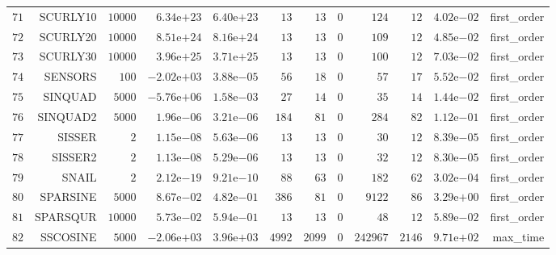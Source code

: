 \begin{longtable}{rrrrrrrrrrrr}
  \(    71\) & SCURLY10 & \( 10000\) & \( 6.34\)e\(+23\) & \( 6.40\)e\(+23\) & \(    13\) & \(    13\) & \(     0\) & \(   124\) & \(    12\) & \( 4.02\)e\(-02\) & first\_order \\
  \(    72\) & SCURLY20 & \( 10000\) & \( 8.51\)e\(+24\) & \( 8.16\)e\(+24\) & \(    13\) & \(    13\) & \(     0\) & \(   109\) & \(    12\) & \( 4.85\)e\(-02\) & first\_order \\
  \(    73\) & SCURLY30 & \( 10000\) & \( 3.96\)e\(+25\) & \( 3.71\)e\(+25\) & \(    13\) & \(    13\) & \(     0\) & \(   100\) & \(    12\) & \( 7.03\)e\(-02\) & first\_order \\
  \(    74\) & SENSORS & \(   100\) & \(-2.02\)e\(+03\) & \( 3.88\)e\(-05\) & \(    56\) & \(    18\) & \(     0\) & \(    57\) & \(    17\) & \( 5.52\)e\(-02\) & first\_order \\
  \(    75\) & SINQUAD & \(  5000\) & \(-5.76\)e\(+06\) & \( 1.58\)e\(-03\) & \(    27\) & \(    14\) & \(     0\) & \(    35\) & \(    14\) & \( 1.44\)e\(-02\) & first\_order \\
  \(    76\) & SINQUAD2 & \(  5000\) & \( 1.96\)e\(-06\) & \( 3.21\)e\(-06\) & \(   184\) & \(    81\) & \(     0\) & \(   284\) & \(    82\) & \( 1.12\)e\(-01\) & first\_order \\
  \(    77\) & SISSER & \(     2\) & \( 1.15\)e\(-08\) & \( 5.63\)e\(-06\) & \(    13\) & \(    13\) & \(     0\) & \(    30\) & \(    12\) & \( 8.39\)e\(-05\) & first\_order \\
  \(    78\) & SISSER2 & \(     2\) & \( 1.13\)e\(-08\) & \( 5.29\)e\(-06\) & \(    13\) & \(    13\) & \(     0\) & \(    32\) & \(    12\) & \( 8.30\)e\(-05\) & first\_order \\
  \(    79\) & SNAIL & \(     2\) & \( 2.12\)e\(-19\) & \( 9.21\)e\(-10\) & \(    88\) & \(    63\) & \(     0\) & \(   182\) & \(    62\) & \( 3.02\)e\(-04\) & first\_order \\
  \(    80\) & SPARSINE & \(  5000\) & \( 8.67\)e\(-02\) & \( 4.82\)e\(-01\) & \(   386\) & \(    81\) & \(     0\) & \(  9122\) & \(    86\) & \( 3.29\)e\(+00\) & first\_order \\
  \(    81\) & SPARSQUR & \( 10000\) & \( 5.73\)e\(-02\) & \( 5.94\)e\(-01\) & \(    13\) & \(    13\) & \(     0\) & \(    48\) & \(    12\) & \( 5.89\)e\(-02\) & first\_order \\
  \(    82\) & SSCOSINE & \(  5000\) & \(-2.06\)e\(+03\) & \( 3.96\)e\(+03\) & \(  4992\) & \(  2099\) & \(     0\) & \(242967\) & \(  2146\) & \( 9.71\)e\(+02\) & max\_time \\

\end{longtable}
